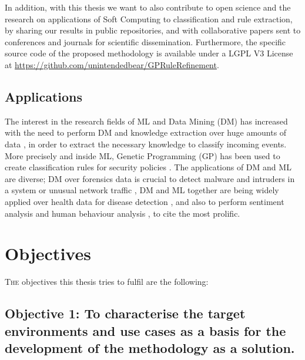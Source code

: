In addition, with this thesis we want to also contribute to open science and the research on applications of Soft Computing to classification and rule extraction, by sharing our results in public repositories, and with collaborative papers sent to conferences and journals for scientific dissemination. 
 Furthermore, the specific source code of the proposed methodology is available under a LGPL V3 License at \url{https://github.com/unintendedbear/GPRuleRefinement}. 

\subsection{Applications}
\label{subsec:apps}

The interest in the research fields of ML and Data Mining (DM) has increased with the need to perform DM and knowledge extraction over huge amounts of data \cite{witten2016data}, in order to extract the necessary knowledge to classify incoming events. More precisely and inside ML, Genetic Programming (GP) has been used to create classification rules for security policies \cite{freitas2002data, DeFalco2002257, sec_policy_evolution_gp_08, pol_evol_gp_3_approaches_08}. The applications of DM and ML are diverse; DM over forensics data is crucial to detect malware \cite{Ma:2011:LDM:1961189.1961202, DeVel2001} and intruders in a system \cite{Jaswal2015} or unusual network traffic \cite{Shalaginov2017359}, DM and ML together are being widely applied over health data for disease detection \cite{Murdoch20131351}, and also to perform sentiment analysis \cite{Poria201445, Ravi201514} and human behaviour analysis \cite{Kosinski20135802}, to cite the most prolific. %

\section{Objectives}                     
\label{sec:intro:objs}

\lettrine{T}{he} objectives this thesis tries to fulfil are the following:

\newcommand{\objectivescenarios}{To characterise the target environments and use cases as a basis for the development of the methodology as a solution.} 

\subsection*{Objective 1: \objectivescenarios}
\label{subsec:intro:obj:problems}

